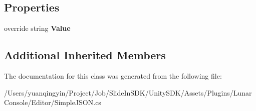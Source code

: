 \subsection*{Properties}
\begin{DoxyCompactItemize}
\item 
\mbox{\label{class_lunar_console_editor_internal_1_1_j_s_o_n_data_ae7e6fe129e434b7acf34cc1e6e7324b8}} 
override string {\bfseries Value}
\end{DoxyCompactItemize}
\subsection*{Additional Inherited Members}


The documentation for this class was generated from the following file\+:\begin{DoxyCompactItemize}
\item 
/\+Users/yuanqingyin/\+Project/\+Job/\+Slide\+In\+S\+D\+K/\+Unity\+S\+D\+K/\+Assets/\+Plugins/\+Lunar\+Console/\+Editor/Simple\+J\+S\+O\+N.\+cs\end{DoxyCompactItemize}
